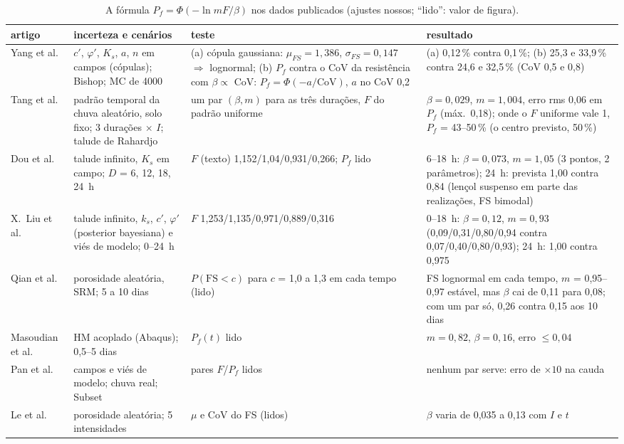 \documentclass[11pt,a4paper]{article}
\newcommand{\Pf}{P_f}
\begin{document}
\begin{table}[H]\centering\scriptsize\setlength{\tabcolsep}{3pt}
\caption{A fórmula $\Pf = \Phi(-\ln mF/\beta)$ nos dados publicados (ajustes nossos; ``lido'': valor de figura).}
\label{tab:lit}
\begin{tabular}{p{2.6cm}p{4.2cm}p{4.6cm}p{4.2cm}}
\toprule
artigo & incerteza e cenários & teste & resultado\\
\midrule
Yang et al.\ \cite{yang2026} & $c'$, $\varphi'$, $K_s$, $a$, $n$ em campos (cópulas); Bishop; MC de 4000 &
(a) cópula gaussiana: $\mu_{FS} = 1{,}386$, $\sigma_{FS} = 0{,}147$ $\Rightarrow$ lognormal; (b) $\Pf$ contra o CoV da
resistência com $\beta \propto$ CoV: $\Pf = \Phi(-a/\mathrm{CoV})$, $a$ no CoV 0,2 & (a) 0,12\,\% contra 0,1\,\%; (b) 25,3
e 33,9\,\% contra 24,6 e 32,5\,\% (CoV 0,5 e 0,8)\\
Tang et al.\ \cite{tang2018} & padrão temporal da chuva aleatório, solo fixo; 3 durações $\times$ $I$; talude de Rahardjo &
um par $(\beta, m)$ para as três durações, $F$ do padrão uniforme & $\beta = 0{,}029$, $m = 1{,}004$, erro rms 0,06 em
$\Pf$ (máx.\ 0,18); onde o $F$ uniforme vale 1, $\Pf$ = 43--50\,\% (o centro previsto, 50\,\%)\\
Dou et al.\ \cite{dou2015} & talude infinito, $K_s$ em campo; $D$ = 6, 12, 18, 24~h &
$F$ (texto) 1,152/1,04/0,931/0,266; $\Pf$ lido & 6--18~h: $\beta = 0{,}073$, $m = 1{,}05$ (3 pontos, 2 parâmetros);
24~h: prevista 1,00 contra 0,84 (lençol suspenso em parte das realizações, FS bimodal)\\
X.\ Liu et al.\ \cite{xliu2025} & talude infinito, $k_s$, $c'$, $\varphi'$ (posterior bayesiana) e viés de modelo; 0--24~h &
$F$ 1,253/1,135/0,971/0,889/0,316 & 0--18~h: $\beta = 0{,}12$, $m = 0{,}93$ (0,09/0,31/0,80/0,94 contra 0,07/0,40/0,80/0,93);
24~h: 1,00 contra 0,975\\
Qian et al.\ \cite{qian2025} & porosidade aleatória, SRM; 5 a 10 dias & $P(\mathrm{FS} < c)$ para $c$ = 1,0 a 1,3 em cada tempo
(lido) & FS lognormal em cada tempo, $m$ = 0,95--0,97 estável, mas $\beta$ cai de 0,11 para 0,08; com um par só, 0,26
contra 0,15 aos 10 dias\\
Masoudian et al.\ \cite{masoudian2019} & HM acoplado (Abaqus); 0,5--5 dias & $\Pf(t)$ lido & $m = 0{,}82$, $\beta = 0{,}16$, erro
$\le 0{,}04$\\
Pan et al.\ \cite{pan2024} & campos e viés de modelo; chuva real; Subset & pares $F$/$\Pf$ lidos & nenhum par serve: erro de
$\times 10$ na cauda\\
Le et al.\ \cite{le2019} & porosidade aleatória; 5 intensidades & $\mu$ e CoV do FS (lidos) & $\beta$ varia de 0,035 a 0,13 com
$I$ e $t$\\
\bottomrule
\end{tabular}
\end{table}
\end{document}
